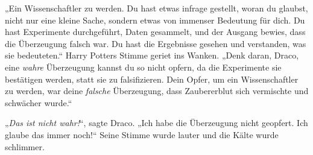 „Ein Wissenschaftler zu werden. Du hast etwas infrage gestellt, woran du glaubst, nicht nur eine kleine Sache, sondern etwas von immenser Bedeutung für dich. Du hast Experimente durchgeführt, Daten gesammelt, und der Ausgang bewies, dass die Überzeugung falsch war. Du hast die Ergebnisse gesehen und verstanden, was sie bedeuteten.“ Harry Potters Stimme geriet ins Wanken.
„Denk daran, Draco, eine \emph{wahre} Überzeugung kannst du so nicht opfern, da die Experimente sie bestätigen werden, statt sie zu falsifizieren. Dein Opfer, um ein Wissenschaftler zu werden, war deine \emph{falsche} Überzeugung, dass Zaubererblut sich vermischte und schwächer wurde.“

„\emph{Das ist nicht wahr!}“, sagte Draco.
„Ich habe die Überzeugung nicht geopfert. Ich glaube das immer noch!“ Seine Stimme wurde lauter und die Kälte wurde schlimmer.

